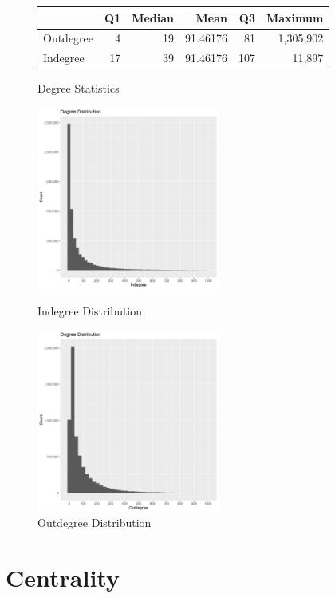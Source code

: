 \documentclass{article}
\begin{document}
\begin{figure}[H]
    \centering
    \caption[]{Degree Statistics}
    \begin{tabular}{lrrrrr}
        \toprule
        & Q1 & Median & Mean & Q3 & Maximum\\
        \midrule
        Outdegree & 4 & 19 & 91.46176 & 81 & 1,305,902\\
        Indegree & 17 & 39 & 91.46176 & 107 & 11,897\\
        \bottomrule
    \end{tabular}
\end{figure}

\begin{figure}[H]
    \centering
    \parbox{6cm}{
    \includegraphics[width=6cm]{in_degree_dist}
    \caption{Indegree Distribution}
    \label{fig:2figsA}}
    \qquad
    \begin{minipage}{6cm}
    \includegraphics[width=6cm]{out_degree_dist}
    \caption{Outdegree Distribution}
    \label{fig:2figsB}
    \end{minipage}
\end{figure}


\section{Centrality}
\end{document}
